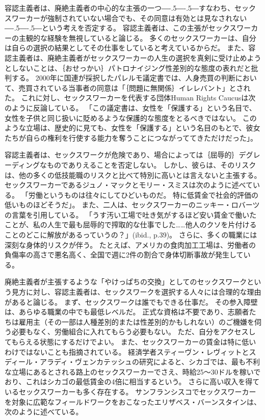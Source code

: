 \documentclass[paper=a4,book,openany]{jlreq}
\newcommand{\ig}[1]{}           %
\def\DDASH{―\kern-.5\zw―\kern-.5\zw―} %
\begin{document}
容認主義者は、廃絶主義者の中心的な主張の一つ{\DDASH}すなわち、セックスワーカーが強制されていない場合でも、その同意は有効とは見なされない{\DDASH}という考えを否定する。
容認主義者は、この主張がセックスワーカーの主観的な経験を無視していると論じる。
多くのセックスワーカーは、自分は自らの選択の結果としてその仕事をしていると考えているからだ。
また、容認主義者は、廃絶主義者がセックスワーカーの人生の選択を真剣に受け止めようとしないことは、｛おせっかい｝{パトロナイジング}性差別的な態度の表れだと批判する。
2000年に国連が採択したパレルモ議定書では、人身売買の判断において、売買されている当事者の同意は「｛問題に無関係｝{イレレバント}」とされた。
これに対し、セックスワーカーを代表する団体Human Rights Caucusは次のように反論している。
「この議定書は、女性を「保護する」という名目で、女性を子供と同じ扱いに貶めるような保護的な態度をとるべきではない。
このような立場は、歴史的に見ても、女性を「保護する」という名目のもとで、彼女たちが自らの権利を行使する能力を奪うことにつながっててきただけだった」\citep{caucus99:_recom_commen_draft_protoc_combat}。

容認主義者は、セックスワークが危険であり、場合によっては｛屈辱的｝{デグレーディング}なものでありえることを否定しない。
しかし、彼らは、そのリスクは、他の多くの低技能職のリスクと比べて特別に高いとは言えないと主張する。
セックスワーカーであるジュノ・マックとモリー・スミスは次のように述べている。
「労働というものは往々にしてひどいものだ。
特に低賃金で社会的評価の低いものほどそうだ」\citep[p.43]{mac18:_revol_prost}。
また、二人は、セックスワーカーのニッキー・ロバーツ\ig{Nickie Roberts}の言葉を引用している。
「うす汚い工場で吐き気がするほど安い賃金で働いたことが、私の人生で最も屈辱的で搾取的な仕事でした……他人のクソを片付けることのどこに解放があるっていうの？」(ibid., p.39)。
さらに、多くの職業には深刻な身体的リスクが伴う。
たとえば、アメリカの食肉加工工場は、労働者の負傷率の高さで悪名高く、全国で週に2件の割合で身体切断事故が発生している\citep{wasley18:_two_amput_week}。

廃絶主義者が主張するような「やけっぱちの交換」としてのセックスワークという見方に対し、容認主義者は、セックスワークを選択する人々には合理的な理由があると論じる。
まず、セックスワークは誰でもできる仕事だ。
その参入障壁は、あらゆる職業の中でも最低レベルだ。
正式な資格は不要であり、志願者たちは雇用主（その一部は人種差別的または性差別的かもしれない）のご機嫌を伺う必要もなく、労働組合に入れてもらう必要もない。
ただ、自分をアクセスしてもらえる状態にするだけでよい。
また、セックスワーカーの賃金は特に低いわけではないことも指摘されている。
経済学者スティーヴン・レヴィットとスディール・アラディ・ヴェンカテッシュの研究によると、シカゴでは、最も不利な立場にあるとされる路上のセックスワーカーでさえ、時給25～30ドルを稼いでおり、これはシカゴの最低賃金の4倍に相当するという\citep[p.26]{levitt07:_empir_analy_street_level_prost}。
さらに高い収入を得ているセックスワーカーも多く存在する。
サンフランシスコでセックスワーカーを対象に広範なフィールドワークをおこなったエリザベス・バーンスタインは、次のように述べている。
\end{document}

